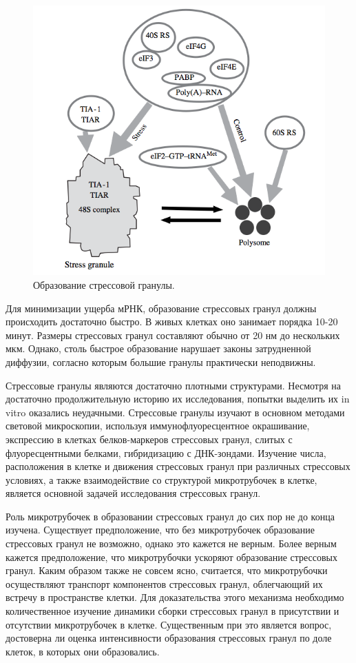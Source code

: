 \documentclass[14pt,a4paper]{extarticle}
\begin{document}
\begin{figure}[hbt]\centering
\includegraphics[width=0.9\columnwidth]{../pics/Sg-content.png}
\caption{Образование стрессовой гранулы.}
\label{fig:sg-content}
\end{figure}

	 Для минимизации ущерба мРНК, образование стрессовых гранул должны происходить достаточно быстро. В живых клетках оно занимает порядка 10-20 минут. Размеры стрессовых гранул составляют обычно от 20 нм до нескольких мкм. Однако, столь быстрое образование нарушает законы затрудненной диффузии, согласно которым большие гранулы практически неподвижны.
	 
	 Стрессовые гранулы являются достаточно плотными структурами. Несмотря на достаточно продолжительную историю их исследования, попытки выделить их in vitro оказались неудачными. Стрессовые гранулы изучают в основном методами световой микроскопии, используя иммунофлуоресцентное окрашивание, экспрессию в клетках белков-маркеров стрессовых гранул, слитых с флуоресцентными белками, гибридизацию с ДНК-зондами. Изучение числа, расположения в клетке и движения стрессовых гранул при различных стрессовых условиях, а также взаимодействие со структурой микротрубочек в клетке, является основной задачей исследования стрессовых гранул.
	 
	 Роль микротрубочек в образовании стрессовых гранул до сих пор не до конца изучена. Существует предположение, что без микротрубочек образование стрессовых гранул не возможно, однако это кажется не верным. Более верным кажется предположение, что микротрубочки ускоряют образование стрессовых гранул. Каким образом также не совсем ясно, считается, что микротрубочки осуществляют транспорт компонентов стрессовых гранул, облегчающий их встречу в пространстве клетки. Для доказательства этого механизма необходимо количественное изучение динамики сборки стрессовых гранул в присутствии и отсутствии микротрубочек в клетке. Существенным при это является вопрос, достоверна ли оценка интенсивности образования стрессовых гранул по доле клеток, в которых они образовались.
\end{document}
